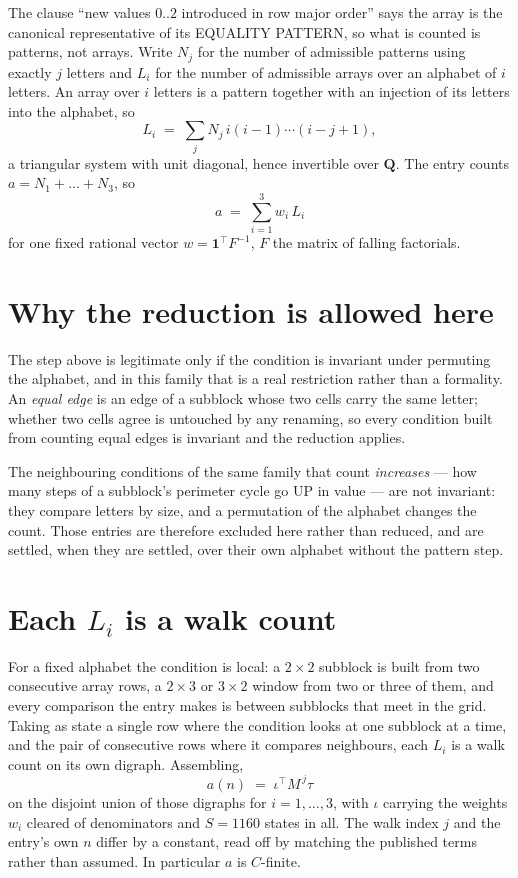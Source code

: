 \documentclass[11pt,a4paper]{article}
\theoremstyle{plain}
\theoremstyle{definition}
\begin{document}
The clause ``new values $0..2$ introduced in row major order'' says the array is the
canonical representative of its EQUALITY PATTERN, so what is counted is patterns, not arrays.
Write $N_j$ for the number of admissible patterns using exactly $j$ letters and $L_i$ for the
number of admissible arrays over an alphabet of $i$ letters. An array over $i$ letters is a
pattern together with an injection of its letters into the alphabet, so
\[
L_i\;=\;\sum_j N_j\,i(i-1)\cdots(i-j+1),
\]
a triangular system with unit diagonal, hence invertible over $\mathbf{Q}$. The entry counts
$a=N_1+\dots+N_{3}$, so
\[
a\;=\;\sum_{i=1}^{3}w_i\,L_i
\]
for one fixed rational vector $w=\mathbf{1}^{\!\top}F^{-1}$, $F$ the matrix of falling
factorials.

\section{Why the reduction is allowed here}

The step above is legitimate only if the condition is invariant under permuting the alphabet,
and in this family that is a real restriction rather than a formality. An \emph{equal edge}
is an edge of a subblock whose two cells carry the same letter; whether two cells agree is
untouched by any renaming, so every condition built from counting equal edges is invariant and
the reduction applies.

The neighbouring conditions of the same family that count \emph{increases} --- how many steps
of a subblock's perimeter cycle go UP in value --- are not invariant: they compare letters by
size, and a permutation of the alphabet changes the count. Those entries are therefore excluded
here rather than reduced, and are settled, when they are settled, over their own alphabet
without the pattern step.

\section{Each $L_i$ is a walk count}

For a fixed alphabet the condition is local: a $2\times2$ subblock is built from two
consecutive array rows, a $2\times3$ or $3\times2$ window from two or three of them, and every
comparison the entry makes is between subblocks that meet in the grid. Taking as state a single
row where the condition looks at one subblock at a time, and the pair of consecutive rows where
it compares neighbours, each $L_i$ is a walk count on its own digraph. Assembling,
\[
a(n)\;=\;\iota^{\!\top}M^{\,j}\tau
\]
on the disjoint union of those digraphs for $i=1,\dots,3$, with $\iota$ carrying the weights
$w_i$ cleared of denominators and $S=1160$ states in all. The walk index $j$ and the entry's own
$n$ differ by a constant, read off by matching the published terms rather than assumed. In
particular $a$ is $C$-finite.
\end{document}
